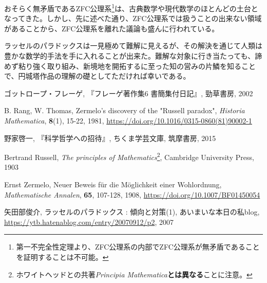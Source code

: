 \documentclass[10pt, a5paper, twoside]{jsarticle}
\theoremstyle{definition}
\begin{document}
		おそらく無矛盾であるZFC公理系\footnote{第一不完全性定理より、ZFC公理系の内部でZFC公理系が無矛盾であることを証明することは不可能。}は、古典数学や現代数学のほとんどの土台となってきた。しかし、先に述べた通り、ZFC公理系では扱うことの出来ない領域があることから、ZFC公理系を離れた議論も盛んに行われている。

		ラッセルのパラドックスは一見極めて難解に見えるが、その解決を通じて人類は豊かな数学的手法を手に入れることが出来た。難解な対象に行き当たっても、諦めず粘り強く取り組み、新境地を開拓するに至った知の営みの片鱗を知ることで、円城塔作品の理解の礎としてただければ幸いである。

	\begin{thebibliography}{99}

		 ゴットロープ・フレーゲ, 『フレーゲ著作集6 書簡集付日記』, 勁草書房, 2002

		 B. Rang, W. Thomas, Zermelo's discovery of the "Russell paradox", \textit{Historia Mathematica}, \textbf{8}(1), 15-22, 1981, \url{https://doi.org/10.1016/0315-0860(81)90002-1}

		 野家啓一, 『科学哲学への招待』, ちくま学芸文庫, 筑摩書房, 2015

		 Bertrand Russell, \textit{The principles of Mathematics}\footnote{ホワイトヘッドとの共著\textit{Principia Mathematica}\textbf{とは異なる}ことに注意。}, Cambridge University Press, 1903

		 Ernst Zermelo, Neuer Beweis für die Möglichkeit einer Wohlordnung, \textit{Mathematische Annalen}, \textbf{65}, 107-128, 1908, \url{https://doi.org/10.1007/BF01450054}

		 矢田部俊介, ラッセルのパラドックス : 傾向と対策(1), あいまいな本日の私blog, \url{https://ytb.hatenablog.com/entry/20070912/p2}, 2007

	\end{thebibliography}
\end{document}
